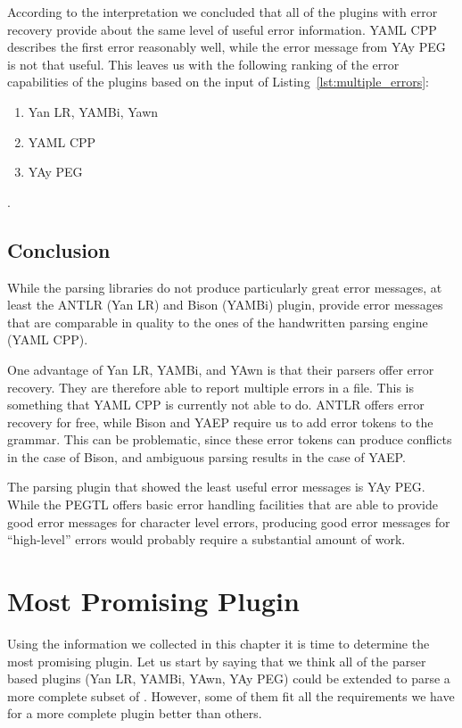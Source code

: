 According to the interpretation we concluded that all of the plugins with error recovery provide about the same level of useful error information. YAML CPP describes the first error reasonably well, while the error message from YAy PEG is not that useful. This leaves us with the following ranking of the error capabilities of the plugins based on the input of Listing~\ref{lst:multiple_errors}:

\begin{enumerate}
  \item Yan LR, YAMBi, Yawn
  \item YAML CPP
  \item YAy PEG
\end{enumerate}

.

\subsection{Conclusion}

While the parsing libraries do not produce particularly great error messages, at least the ANTLR (Yan LR) and Bison (YAMBi) plugin, provide error messages that are comparable in quality to the ones of the handwritten parsing engine (YAML CPP).

One advantage of Yan LR, YAMBi, and YAwn is that their parsers offer error recovery. They are therefore able to report multiple errors in a file. This is something that YAML CPP is currently not able to do. ANTLR offers error recovery for free, while Bison and YAEP require us to add error tokens to the grammar. This can be problematic, since these error tokens can produce conflicts in the case of Bison, and ambiguous parsing results in the case of YAEP.

The parsing plugin that showed the least useful error messages is YAy PEG. While the PEGTL offers basic error handling facilities that are able to provide good error messages for character level errors, producing good error messages for “high-level” errors would probably require a substantial amount of work.

\section{Most Promising Plugin}

Using the information we collected in this chapter it is time to determine the most promising  plugin. Let us start by saying that we think all of the parser based  plugins (Yan LR, YAMBi, YAwn, YAy PEG) could be extended to parse a more complete subset of . However, some of them fit all the requirements we have for a more complete  plugin better than others.

